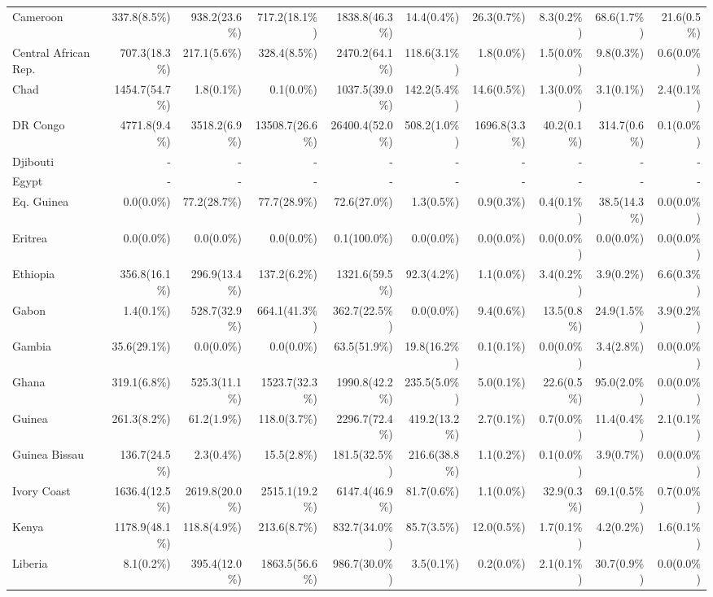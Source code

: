 \begin{scriptsize}
\begin{landscape}
\begin{center}
\begin{longtable}[ht]{lrrrrrrrrr}
			Cameroon&337.8(8.5\%)&938.2(23.6\%)&717.2(18.1\%)&1838.8(46.3\%)&14.4(0.4\%)&26.3(0.7\%)&8.3(0.2\%)&68.6(1.7\%)&21.6(0.5\%)\\
			Central African Rep.&707.3(18.3\%)&217.1(5.6\%)&328.4(8.5\%)&2470.2(64.1\%)&118.6(3.1\%)&1.8(0.0\%)&1.5(0.0\%)&9.8(0.3\%)&0.6(0.0\%)\\
			Chad&1454.7(54.7\%)&1.8(0.1\%)&0.1(0.0\%)&1037.5(39.0\%)&142.2(5.4\%)&14.6(0.5\%)&1.3(0.0\%)&3.1(0.1\%)&2.4(0.1\%)\\
			DR Congo&4771.8(9.4\%)&3518.2(6.9\%)&13508.7(26.6\%)&26400.4(52.0\%)&508.2(1.0\%)&1696.8(3.3\%)&40.2(0.1\%)&314.7(0.6\%)&0.1(0.0\%)\\
			Djibouti&-&-&-&-&-&-&-&-&-\\
			Egypt&-&-&-&-&-&-&-&-&-\\
			Eq. Guinea&0.0(0.0\%)&77.2(28.7\%)&77.7(28.9\%)&72.6(27.0\%)&1.3(0.5\%)&0.9(0.3\%)&0.4(0.1\%)&38.5(14.3\%)&0.0(0.0\%)\\
			Eritrea&0.0(0.0\%)&0.0(0.0\%)&0.0(0.0\%)&0.1(100.0\%)&0.0(0.0\%)&0.0(0.0\%)&0.0(0.0\%)&0.0(0.0\%)&0.0(0.0\%)\\
			Ethiopia&356.8(16.1\%)&296.9(13.4\%)&137.2(6.2\%)&1321.6(59.5\%)&92.3(4.2\%)&1.1(0.0\%)&3.4(0.2\%)&3.9(0.2\%)&6.6(0.3\%)\\
			Gabon&1.4(0.1\%)&528.7(32.9\%)&664.1(41.3\%)&362.7(22.5\%)&0.0(0.0\%)&9.4(0.6\%)&13.5(0.8\%)&24.9(1.5\%)&3.9(0.2\%)\\
			Gambia&35.6(29.1\%)&0.0(0.0\%)&0.0(0.0\%)&63.5(51.9\%)&19.8(16.2\%)&0.1(0.1\%)&0.0(0.0\%)&3.4(2.8\%)&0.0(0.0\%)\\
			Ghana&319.1(6.8\%)&525.3(11.1\%)&1523.7(32.3\%)&1990.8(42.2\%)&235.5(5.0\%)&5.0(0.1\%)&22.6(0.5\%)&95.0(2.0\%)&0.0(0.0\%)\\
			Guinea&261.3(8.2\%)&61.2(1.9\%)&118.0(3.7\%)&2296.7(72.4\%)&419.2(13.2\%)&2.7(0.1\%)&0.7(0.0\%)&11.4(0.4\%)&2.1(0.1\%)\\
			Guinea Bissau&136.7(24.5\%)&2.3(0.4\%)&15.5(2.8\%)&181.5(32.5\%)&216.6(38.8\%)&1.1(0.2\%)&0.1(0.0\%)&3.9(0.7\%)&0.0(0.0\%)\\
			Ivory Coast&1636.4(12.5\%)&2619.8(20.0\%)&2515.1(19.2\%)&6147.4(46.9\%)&81.7(0.6\%)&1.1(0.0\%)&32.9(0.3\%)&69.1(0.5\%)&0.7(0.0\%)\\
			Kenya&1178.9(48.1\%)&118.8(4.9\%)&213.6(8.7\%)&832.7(34.0\%)&85.7(3.5\%)&12.0(0.5\%)&1.7(0.1\%)&4.2(0.2\%)&1.6(0.1\%)\\
			Liberia&8.1(0.2\%)&395.4(12.0\%)&1863.5(56.6\%)&986.7(30.0\%)&3.5(0.1\%)&0.2(0.0\%)&2.1(0.1\%)&30.7(0.9\%)&0.0(0.0\%)\\

\end{longtable}
\end{center}
\end{landscape}
\end{scriptsize}
